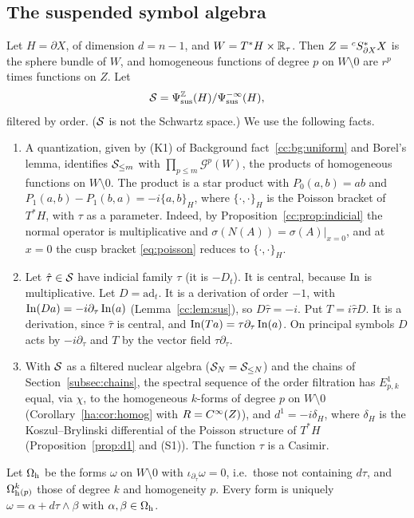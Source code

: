 \subsection{The suspended symbol algebra}\label{su:subsec:S}

Let \(H=\partial X\), of dimension \(d=n-1\), and
\(W=T^*H\times\mathbb R_\tau\). Then \(Z={}^cS^*_{\partial X}X\) is the sphere bundle of \(W\), and
homogeneous functions of degree \(p\) on \(W\setminus0\) are \(r^p\)
times functions on \(Z\). Let
\[
 \mathcal S=\Psi_{\mathrm{sus}}^{\mathbb Z}(H)/\Psi_{\mathrm{sus}}^{-\infty}(H),
\]
filtered by order. (\(\mathcal S\) is not the Schwartz space.) We use the
following facts.
\begin{enumerate}
\item[(S1)] A quantization, given by (K1) of Background
fact~\ref{cc:bg:uniform} and Borel's lemma, identifies \(\mathcal S_{\le m}\)
with \(\prod_{p\le m}\mathcal G^p(W)\), the products of homogeneous
functions on
\(W\setminus0\). The product is a star product with \(P_0(a,b)=ab\) and
\(P_1(a,b)-P_1(b,a)=-i\{a,b\}_H\), where \(\{\cdot,\cdot\}_H\) is the
Poisson bracket of \(T^*H\), with \(\tau\) as a parameter. Indeed, by
Proposition~\ref{cc:prop:indicial} the normal operator is multiplicative
and \(\sigma(N(A))=\sigma(A)|_{x=0}\), and at \(x=0\) the cusp bracket
\eqref{eq:poisson} reduces to \(\{\cdot,\cdot\}_H\).
\item[(S2)] Let \(\hat\tau\in\mathcal S\) have indicial family \(\tau\) (it is
\(-D_t\)). It is central, because \(\operatorname{In}\) is multiplicative. Let
\(D=\mathrm{ad}_t\). It is a derivation of order \(-1\), with
\(\operatorname{In}(Da)=-i\partial_\tau\operatorname{In}(a)\) (Lemma~\ref{cc:lem:sus}), so
\(D\hat\tau=-i\). Put \(T=i\hat\tau D\). It is a derivation, since
\(\hat\tau\) is central, and \(\operatorname{In}(Ta)=\tau\partial_\tau\operatorname{In}(a)\). On
principal symbols \(D\) acts by \(-i\partial_\tau\) and \(T\) by the
vector field \(\tau\partial_\tau\).
\item[(S3)] With \(\mathcal S\) as a filtered nuclear algebra
(\(\mathcal S_N=\mathcal S_{\le N}\)) and the chains of
Section~\ref{subsec:chains}, the spectral sequence of the order
filtration has \(E^1_{p,k}\) equal, via \(\chi\), to the homogeneous
\(k\)-forms of degree \(p\) on \(W\setminus0\)
(Corollary~\ref{ha:cor:homog} with \(R=C^\infty(Z)\)), and \(d^1=-i\delta_H\),
where \(\delta_H\) is the Koszul--Brylinski differential of the Poisson
structure of \(T^*H\) (Proposition~\ref{prop:d1} and (S1)). The function
\(\tau\) is a Casimir.
\end{enumerate}

Let \(\Omega_{\mathrm h}\) be the forms \(\omega\) on \(W\setminus0\) with
\(\iota_{\partial_\tau}\omega=0\), i.e.\ those not containing \(d\tau\),
and \(\Omega_{\mathrm h}^k{}_{(p)}\) those of degree \(k\) and homogeneity \(p\). Every
form is uniquely \(\omega=\alpha+d\tau\wedge\beta\) with \(\alpha,\beta\in
\Omega_{\mathrm h}\).

